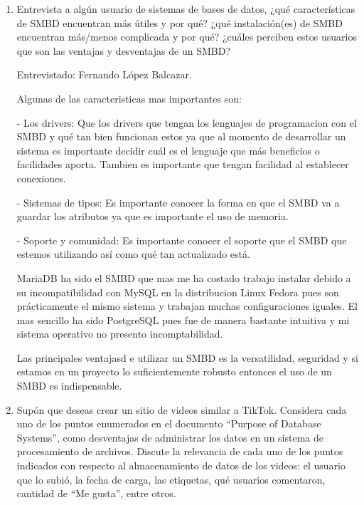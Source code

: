 \documentclass[12pt,a4paper]{article}
\begin{document}
\begin{enumerate}
\begin{enumerate}
				[1] https://es.wikipedia.org/wiki/Administrador_de_base_de_datoshttps://es.wikipedia.org/wiki/Administrador_de_base_de_datos
	
				
			\item Entrevista a algún usuario de sistemas de bases de datos, ¿qué características de SMBD encuentran
				más útiles y por qué? ¿qué instalación(es) de SMBD encuentran más/menos complicada y por qué?
				¿cuáles perciben estos usuarios que son las ventajas y desventajas de un SMBD?
				
			      Entrevistado: Fernando López Balcazar.	
				
			      Algunas de las caracteristicas mas importantes son:
                              
			      - Los drivers:
                              Que los drivers que tengan los lenguajes de programacion con el SMBD y qué tan bien funcionan estos ya que al momento de          		       desarrollar un sistema es importante decidir cuál es el lenguaje que más beneficios o facilidades aporta. Tambien es 				      importante que tengan facilidad al establecer conexiones.

			      - Sistemas de tipos:	
			      Es importante conocer la forma en que el SMBD va a guardar los atributos ya que es importante el uso de memoria.

			      - Soporte y comunidad:
			      Es importante conocer el soporte que el SMBD que estemos utilizando así como qué tan actualizado está.

		              MariaDB ha sido el SMBD que mas me ha costado trabajo instalar debido a su incompatibilidad con MySQL en la distribucion 				      Linux Fedora pues son prácticamente el mismo sistema y trabajan muchas configuraciones iguales. El mas sencillo ha sido 				      PostgreSQL pues fue de manera bastante intuitiva y mi sistema operativo no presento incomptabilidad.

			      Las principales ventajasd e utilizar un SMBD es la versatilidad, seguridad y si estamos en un proyecto lo suficientemente 			      robusto entonces el uso de un SMBD es indispensable.
	
				
			\item Supón que deseas crear un sitio de videos similar a TikTok. Considera cada uno de los puntos
				enumerados en el documento “Purpose of Database Systems”, como desventajas de administrar los
				datos en un sistema de procesamiento de archivos. Discute la relevancia de cada uno de los puntos
				indicados con respecto al almacenamiento de datos de los videos: el usuario que lo subió, la fecha de
				carga, las etiquetas, qué usuarios comentaron, cantidad de “Me gusta”, entre otros.


\end{enumerate}
\end{enumerate}
\end{document}
